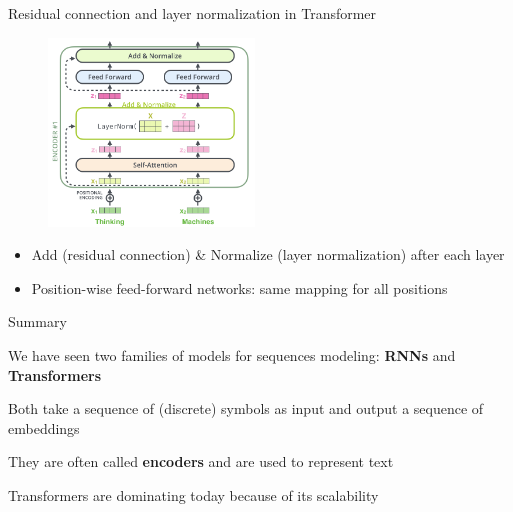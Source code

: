 \documentclass[usenames,dvipsnames,notes,11pt,aspectratio=169,hyperref={colorlinks=true, linkcolor=blue}]{beamer}
\begin{document}
\begin{frame}
    {Residual connection and layer normalization in Transformer}
    \begin{figure}
        \includegraphics[height=5cm]{figures/add-norm}
    \end{figure}
    \vspace{-2em}
    \begin{itemize}
        \item Add (residual connection) \& Normalize (layer normalization) after each layer
        \item Position-wise feed-forward networks: same mapping for all positions
    \end{itemize}
\end{frame}

\begin{frame}
    {Summary}
    \begin{wideitemize}
        \item We have seen two families of models for sequences modeling: \textbf{RNNs} and \textbf{Transformers}
        \item Both take a sequence of (discrete) symbols as input and output a sequence of embeddings
        \item They are often called \textbf{encoders} and are used to represent text
        \item Transformers are dominating today because of its scalability
    \end{wideitemize}
\end{frame}
\end{document}

